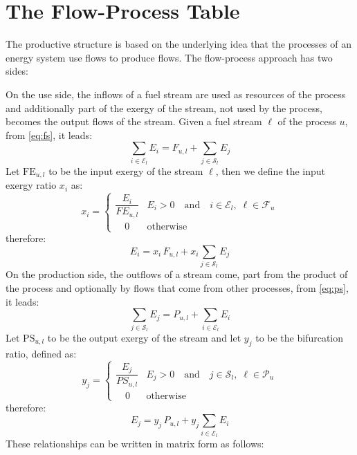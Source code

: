 \documentclass{ecos}
\begin{document}
\section{The Flow-Process Table}
The productive structure is based on the underlying idea that the processes of an energy system use flows to produce flows. The flow-process approach has two sides:

On the use side, the inflows of a fuel stream are used as resources of the process and additionally part of the exergy of the stream, not used by the process, becomes the output flows of the stream. Given a fuel stream $\ell$ of the process $u$, from \cref{eq:fs}, it leads:
\begin{equation}
\sum_{i\in\mathcal{E}_l} E_i = F_{u,l} + \sum_{j\in\mathcal{S}_l} E_j
\end{equation}
Let $\mathrm{FE}_{u,l}$ to be the input exergy of the stream $\ell$, then we define the input exergy ratio $x_i$ as:
\begin{equation}
x_i=\begin{cases}
\dfrac{E_i}{FE_{u,l}}& E_i>0 \quad \text{and} \quad i\in\mathcal{E}_l,\; \ell\in\mathcal{F}_u \\[1em]
\quad0&\text{otherwise}
\end{cases}
\end{equation}
therefore:
\begin{equation}
E_i = x_i \, F_{u,l} + x_i\sum_{j\in\mathcal{S}_l} E_j
\end{equation}
On the production side, the outflows of a stream come, part from the product of the process and optionally by flows that come from other processes, from \cref{eq:ps}, it leads:
\begin{equation}
\sum_{j\in\mathcal{S}_l} E_j = P_{u,l} + \sum_{i\in\mathcal{E}_l} E_i
\end{equation}
Let $\mathrm{PS}_{u,l}$ to be the output exergy of the stream and let $y_j$ to be the bifurcation ratio, defined as:
\begin{equation}
y_j=\begin{cases}
\dfrac{E_j}{PS_{u,l}}& E_j>0 \quad \text{and} \quad j\in\mathcal{S}_l,\; \ell\in\mathcal{P}_u \\[1em]
\quad0&\text{otherwise}
\end{cases}
\end{equation}
therefore:
\begin{equation}
E_j = y_j \, P_{u,l} + y_j\sum_{i\in\mathcal{E}_l} E_i
\end{equation}
These relationships can be written in matrix form as follows:
\end{document}
